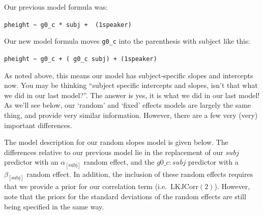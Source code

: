 \documentclass[
]{book}
\begin{document}
Our previous model formula was:

\texttt{pheight\ \textasciitilde{}\ g0\_c\ *\ subj\ +\ \ (1\textbar{}speaker)}

Our new model formula moves \texttt{g0\_c} into the parenthesis with subject like this:

\texttt{pheight\ \textasciitilde{}\ g0\_c\ +\ (\ g0\_c\ \textbar{}subj)\ +\ (1\textbar{}speaker)}

As noted above, this means our model has subject-specific slopes and intercepts now. You may be thinking ``subject specific intercepts and slopes, isn't that what we did in our last model?''. The answer is yes, it is what we did in our last model! As we'll see below, our `random' and `fixed' effects models are largely the same thing, and provide very similar information. However, there are a few very (very) important differences.

The model description for our random slopes model is given below. The differences relative to our previous model lie in the replacement of our \(subj\) predictor with an \(\alpha_{[\mathrm{subj}]}\) random effect, and the \(g0 \_ c \colon subj\) predictor with a \(\beta_{[\mathrm{subj}]}\) random effect. In addition, the inclusion of these random effects requires that we provide a prior for our correlation term (i.e.~\(\mathrm{LKJCorr} (2)\)). However, note that the priors for the standard deviations of the random effects are still being specified in the same way.
\end{document}
